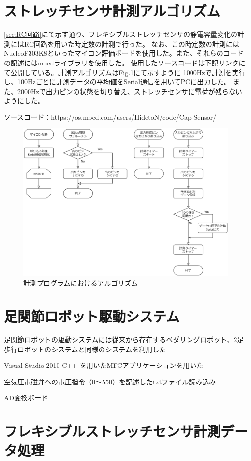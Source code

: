 \section{ストレッチセンサ計測アルゴリズム}
\ref{sec:RC回路}にて示す通り、フレキシブルストレッチセンサの静電容量変化の計測にはRC回路を用いた時定数の計測で行った。
なお、この時定数の計測にはNucleoF303K8といったマイコン評価ボードを使用した。また、それらのコードの記述にはmbedライブラリを使用した。
使用したソースコードは下記リンクにて公開している。計測アルゴリズムはFig.\ref{fig:algorithm}にて示すように
1000Hzで計測を実行し、100Hzごとに計測データの平均値をSerial通信を用いてPCに出力した。
また、2000Hzで出力ピンの状態を切り替え、ストレッチセンサに電荷が残らないようにした。

ソースコード：https://os.mbed.com/users/HidetoN/code/Cap-Sensor/

\begin{figure}[h]
    \begin{center}
     \includegraphics[width=0.9\columnwidth,clip]{./3_analysis/algorithm.eps}
     \caption{計測プログラムにおけるアルゴリズム}
     \label{fig:algorithm}
    \end{center}
\end{figure}

\section{足関節ロボット駆動システム}
足関節ロボットの駆動システムには従来から存在するペダリングロボット、2足歩行ロボットのシステムと同様のシステムを利用した

Visual Studio 2010 C++ を用いたMFCアプリケーションを用いた

空気圧電磁弁への電圧指令（0～550）を記述したtxtファイル読み込み

AD変換ボード

\section{フレキシブルストレッチセンサ計測データ処理}
